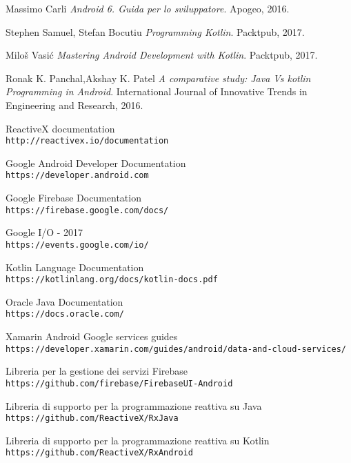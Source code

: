 

\begin{thebibliography}{9}

Massimo Carli
\textit{Android 6. Guida per lo sviluppatore}.
Apogeo, 2016.

Stephen Samuel, Stefan Bocutiu
\textit{Programming Kotlin}.
Packtpub, 2017.

 Miloš Vasić
 \textit{Mastering Android Development with Kotlin}.
Packtpub, 2017.


Ronak K. Panchal,Akshay K. Patel \textit{A comparative study: Java Vs kotlin Programming in Android}.
International Journal of Innovative Trends in Engineering and Research, 2016.

ReactiveX documentation
\\\texttt{http://reactivex.io/documentation}

Google Android Developer Documentation
\\\texttt{https://developer.android.com}

Google Firebase Documentation
\\\texttt{https://firebase.google.com/docs/}

Google I/O - 2017
\\\texttt{https://events.google.com/io/}

Kotlin Language Documentation
\\\texttt{https://kotlinlang.org/docs/kotlin-docs.pdf}

Oracle Java Documentation
\\\texttt{https://docs.oracle.com/}

Xamarin Android Google services guides
\\\texttt{https://developer.xamarin.com/guides/android/data-and-cloud-services/}

Libreria per la gestione dei servizi Firebase
\\\texttt{https://github.com/firebase/FirebaseUI-Android}

Libreria di supporto per la programmazione reattiva su Java
\\\texttt{https://github.com/ReactiveX/RxJava}

Libreria di supporto per la programmazione reattiva su Kotlin
\\\texttt{https://github.com/ReactiveX/RxAndroid}


\end{thebibliography}
